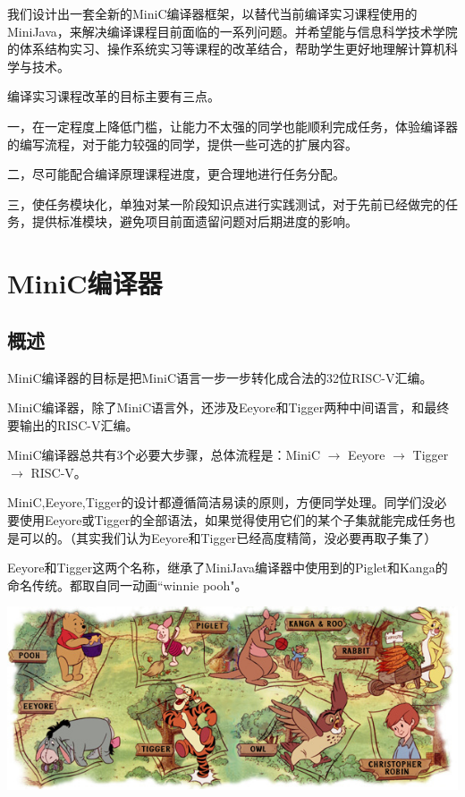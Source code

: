 \documentclass[a4paper]{ctexart}
\begin{document}
我们设计出一套全新的MiniC编译器框架，以替代当前编译实习课程使用的MiniJava，来解决编译课程目前面临的一系列问题。并希望能与信息科学技术学院的体系结构实习、操作系统实习等课程的改革结合，帮助学生更好地理解计算机科学与技术。

编译实习课程改革的目标主要有三点。

一，在一定程度上降低门槛，让能力不太强的同学也能顺利完成任务，体验编译器的编写流程，对于能力较强的同学，提供一些可选的扩展内容。

二，尽可能配合编译原理课程进度，更合理地进行任务分配。

三，使任务模块化，单独对某一阶段知识点进行实践测试，对于先前已经做完的任务，提供标准模块，避免项目前面遗留问题对后期进度的影响。

\newpage
\section{MiniC编译器}

\subsection{概述}

MiniC编译器的目标是把MiniC语言一步一步转化成合法的32位RISC-V汇编。

MiniC编译器，除了MiniC语言外，还涉及Eeyore和Tigger两种中间语言，和最终要输出的RISC-V汇编。

MiniC编译器总共有3个必要大步骤，总体流程是：MiniC $\rightarrow$ Eeyore $\rightarrow$ Tigger $\rightarrow$ RISC-V。

MiniC,Eeyore,Tigger的设计都遵循简洁易读的原则，方便同学处理。同学们没必要使用Eeyore或Tigger的全部语法，如果觉得使用它们的某个子集就能完成任务也是可以的。（其实我们认为Eeyore和Tigger已经高度精简，没必要再取子集了）

Eeyore和Tigger这两个名称，继承了MiniJava编译器中使用到的Piglet和Kanga的命名传统。都取自同一动画``winnie pooh"。

\begin{center}\includegraphics[width=15cm]{name} \end{center}
\end{document}
